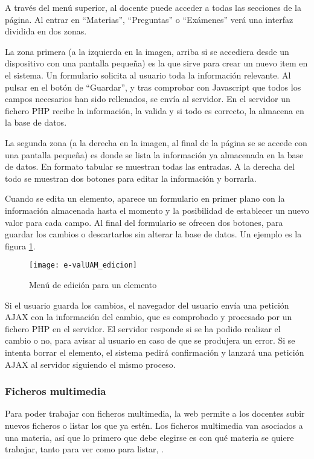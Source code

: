 A través del menú superior, al docente puede acceder a todas las secciones de la página. Al entrar en ``Materias'', ``Preguntas'' o ``Exámenes'' verá una interfaz dividida en dos zonas. 

La zona primera (a la izquierda en la imagen, arriba si se accediera desde un dispositivo con una pantalla pequeña) es la que sirve para crear un nuevo item en el sistema. Un formulario solicita al usuario toda la información relevante. Al pulsar en el botón de ``Guardar'', y tras comprobar con Javascript que todos los campos necesarios han sido rellenados, se envía al servidor. En el servidor un fichero PHP recibe la información, la valida y si todo es correcto, la almacena en la base de datos.

La segunda zona (a la derecha en la imagen, al final de la página se se accede con una pantalla pequeña) es donde se lista la información ya almacenada en la base de datos. En formato tabular se muestran todas las entradas. A la derecha del todo se muestran dos botones para editar la información y borrarla.

Cuando se edita un elemento, aparece un formulario en primer plano con la información almacenada hasta el momento y la posibilidad de establecer un nuevo valor para cada campo. Al final del formulario se ofrecen dos botones, para guardar los cambios o descartarlos sin alterar la base de datos. Un ejemplo es la figura \ref{fig:e-valUAM edicion profesor}.

\begin{figure}[htp!]
	\centering
	\texttt{[image: e-valUAM\_edicion]}
	\caption{Menú de edición para un elemento}
	\label{fig:e-valUAM edicion profesor}
\end{figure}

Si el usuario guarda los cambios, el navegador del usuario envía una petición AJAX con la información del cambio, que es comprobado y procesado por un fichero PHP en el servidor. El servidor responde si se ha podido realizar el cambio o no, para avisar al usuario en caso de que se produjera un error. Si se intenta borrar el elemento, el sistema pedirá confirmación y lanzará una petición AJAX al servidor siguiendo el mismo proceso.

\subsubsection{Ficheros multimedia}

Para poder trabajar con ficheros multimedia, la web permite a los docentes subir nuevos ficheros o listar los que ya estén. Los ficheros multimedia van asociados a una materia, así que lo primero que debe elegirse es con qué materia se quiere trabajar, tanto para ver como para listar, .

